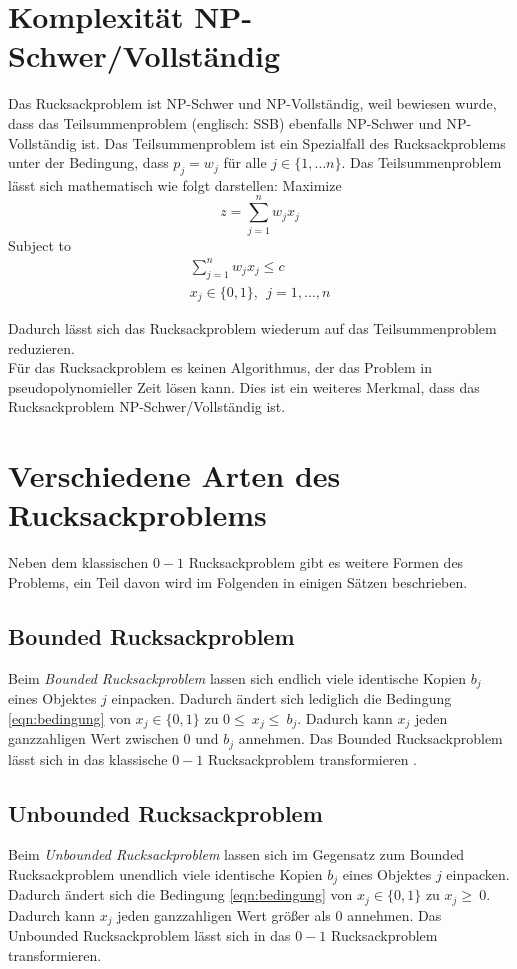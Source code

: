 \section{Komplexität NP-Schwer/Vollständig}
Das Rucksackproblem ist NP-Schwer und NP-Vollständig, weil bewiesen wurde, dass das Teilsummenproblem (englisch: \ac{SSB}) ebenfalls NP-Schwer und NP-Vollständig ist. 
Das Teilsummenproblem ist ein Spezialfall des Rucksackproblems unter der Bedingung, dass $p_j=w_j$ für alle $j \in \{1, \dots n\}$.
Das Teilsummenproblem lässt sich mathematisch wie folgt darstellen: \cite[vgl.][]{Martello1987}
\newpage
Maximize
\begin{equation}
z=\sum_{j=1}^{n}{w_jx_j} 
\end{equation}
Subject to 
\begin{eqnarray}
\sum_{j=1}^{n}{w_jx_j\le c}\\
x_j\in\{0,1\},\ \ j=1,\ldots,n
\end{eqnarray}


Dadurch lässt sich das Rucksackproblem wiederum auf das Teilsummenproblem reduzieren. 
\\
Für das Rucksackproblem es keinen Algorithmus, der das Problem in pseudopolynomieller Zeit lösen kann.
Dies ist ein weiteres Merkmal, dass das Rucksackproblem NP-Schwer/Vollständig ist.

\section{Verschiedene Arten des Rucksackproblems}
Neben dem klassischen $0-1$ Rucksackproblem gibt es weitere Formen des Problems, ein Teil davon wird im Folgenden in einigen Sätzen beschrieben. 
\subsection{Bounded Rucksackproblem}
Beim \textit{Bounded Rucksackproblem} lassen sich endlich viele identische Kopien $b_j$ eines Objektes $j$ einpacken. Dadurch ändert sich lediglich die Bedingung \ref{eqn:bedingung} von $x_j\in\{0,1\}$ zu $0\le\ x_j\le\ b_j$. Dadurch kann $x_j$ jeden ganzzahligen Wert zwischen $0$ und $b_j$ annehmen. \cite[vgl.][]{Martello1990} 
Das Bounded Rucksackproblem lässt sich in das klassische $0-1$ Rucksackproblem transformieren \cite[vgl.][]{Schury2013}.
\subsection{Unbounded Rucksackproblem}
Beim \textit{Unbounded Rucksackproblem} lassen sich im Gegensatz zum Bounded Rucksackproblem unendlich viele identische Kopien $b_j$ eines Objektes $j$ einpacken. 
Dadurch ändert sich die Bedingung \ref{eqn:bedingung} von $x_j\in\{0,1\}$ zu $x_j\geq\ 0$. Dadurch kann $x_j$ jeden ganzzahligen Wert größer als $0$ annehmen.
Das Unbounded Rucksackproblem lässt sich in das $0-1$ Rucksackproblem transformieren. \cite[vgl.][]{Schury2013}
